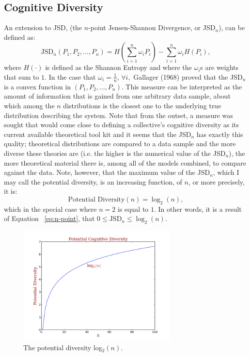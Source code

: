 \documentclass[12pt]{article}
\begin{document}
\subsection{Cognitive Diversity}
An extension to JSD, (the $n$-point Jensen-Shannon Divergence, or JSD$_n$), can be defined as:
\begin{equation} \label{eq:n-point}
\text{JSD}_n(P_1, P_2, \ldots, P_n)=H\left(\sum_{i=1}^n \omega_i P_i\right)-\sum_{i=1}^n \omega_i H(P_i),
\end{equation}
where $H(\cdot)$ is defined as the Shannon Entropy and where the $\omega_i$s are weights that sum to $1$. In the case that $\omega_i=\frac{1}{n}$, $\forall i,$ Gallager (1968) proved that the JSD$_n$ is a convex function in $(P_1, P_2, \ldots, P_n).$ This measure can be interpreted as the amount of information that is gained from one arbitrary data sample, about which among the $n$ distributions is the closest one to the underlying true distribution describing the system. Note that from the outset, a measure was sought that would come close to defining a collective's cognitive diversity as its current available theoretical tool kit and it seems that the JSD$_n$ has exactly this quality; theoretical distributions are compared to a data sample and the more diverse these theories are (i.e. the higher is the numerical value of the JSD$_n$), the more theoretical material there is, among all of the models combined, to compare against the data. Note, however, that the maximum value of the JSD$_n$, which I may call the potential diversity, is an increasing function, of $n$, or more precisely, it is:
\begin{equation} \label{eq:potential}
\text{Potential Diversity}(n)=\log_2(n),
\end{equation}
which in the special case where $n=2$ is equal to $1$. In other words, it is a result of Equation ~\ref{eq:n-point}, that $0 \leq \text{JSD}_n \leq \log_2(n).$
\begin{figure} \label{fig:pot}
\includegraphics[width=80mm]{potential.pdf}
\caption{The potential diversity log$_2(n)$.}
\end{figure}
\end{document}
